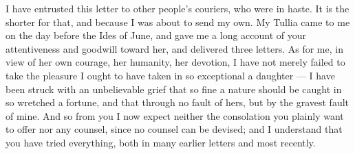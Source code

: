 

 I have entrusted this letter to other people's couriers, who were in haste. It is the shorter for that, and because I was about to send my own. My Tullia came to me on the day before the Ides of June, and gave me a long account of your attentiveness and goodwill toward her, and delivered three letters. As for me, in view of her own courage, her humanity, her devotion, I have not merely failed to take the pleasure I ought to have taken in so exceptional a daughter --- I have been struck with an unbelievable grief that so fine a nature should be caught in so wretched a fortune, and that through no fault of hers, but by the gravest fault of mine. And so from you I now expect neither the consolation you plainly want to offer nor any counsel, since no counsel can be devised; and I understand that you have tried everything, both in many earlier letters and most recently.
